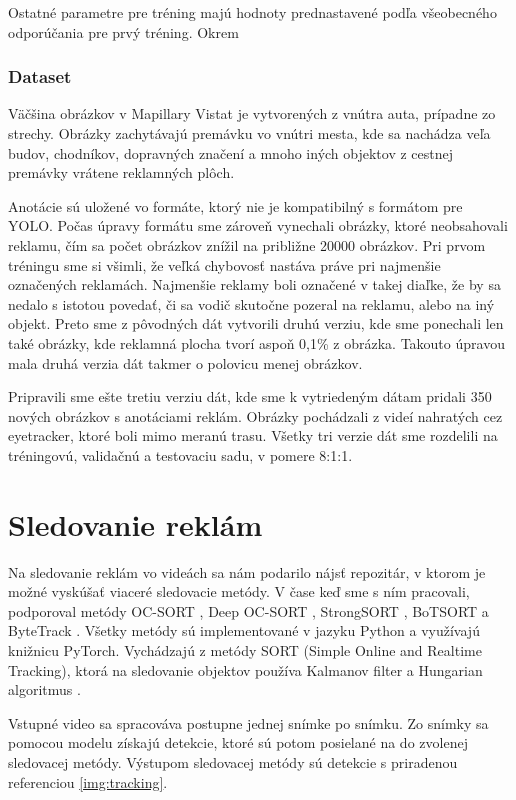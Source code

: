 Ostatné parametre pre tréning majú hodnoty prednastavené podľa všeobecného odporúčania pre prvý tréning. Okrem 

\subsubsection{Dataset}

Väčšina obrázkov v Mapillary Vistat je vytvorených z vnútra auta, prípadne zo strechy. Obrázky zachytávajú premávku vo vnútri mesta, kde sa nachádza veľa budov, chodníkov, dopravných značení a mnoho iných objektov z cestnej premávky vrátene reklamných plôch.

Anotácie sú uložené vo formáte, ktorý nie je kompatibilný s formátom pre YOLO. Počas úpravy formátu sme zároveň vynechali obrázky, ktoré neobsahovali reklamu, čím sa počet obrázkov znížil na približne 20000 obrázkov. Pri prvom tréningu sme si všimli, že veľká chybovosť nastáva práve pri najmenšie označených reklamách. Najmenšie reklamy boli označené v takej diaľke, že by sa nedalo s istotou povedať, či sa vodič skutočne pozeral na reklamu, alebo na iný objekt. Preto sme z pôvodných dát vytvorili druhú verziu, kde sme ponechali len také obrázky, kde reklamná plocha tvorí aspoň 0,1\% z obrázka. Takouto úpravou mala druhá verzia dát takmer o polovicu menej obrázkov.

Pripravili sme ešte tretiu verziu dát, kde sme k vytriedeným dátam pridali 350 nových obrázkov s anotáciami reklám. Obrázky pochádzali z videí nahratých cez eyetracker, ktoré boli mimo meranú trasu. Všetky tri verzie dát sme rozdelili na tréningovú, validačnú a testovaciu sadu, v pomere 8:1:1.

\section{Sledovanie reklám}

Na sledovanie reklám vo videách sa nám podarilo nájsť repozitár, v ktorom je možné vyskúšať viaceré sledovacie metódy. V čase keď sme s ním pracovali, podporoval metódy OC-SORT \cite{ocsort}, Deep OC-SORT \cite{TODO}, StrongSORT \cite{strongsort}, BoTSORT \cite{TODO} a ByteTrack \cite{bytetrack}. Všetky metódy sú implementované v jazyku Python a využívajú knižnicu PyTorch. Vychádzajú z metódy SORT (Simple Online and Realtime Tracking), ktorá na sledovanie objektov používa Kalmanov filter a Hungarian algoritmus \cite{sort}.

Vstupné video sa spracováva postupne jednej snímke po snímku. Zo snímky sa pomocou modelu získajú detekcie, ktoré sú potom posielané na do zvolenej sledovacej metódy. Výstupom sledovacej metódy sú detekcie s priradenou referenciou \ref{img:tracking}.

